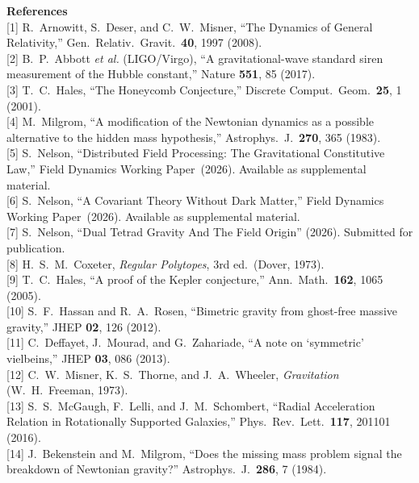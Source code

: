 \documentclass[11pt]{article}
\begin{document}
\small
\textbf{References}\\[4pt]
{[1]} R.~Arnowitt, S.~Deser, and C.~W.~Misner, ``The Dynamics of General Relativity,'' Gen.\ Relativ.\ Gravit.\ \textbf{40}, 1997 (2008).\\
{[2]} B.~P.~Abbott \textit{et al.} (LIGO/Virgo), ``A gravitational-wave standard siren measurement of the Hubble constant,'' Nature \textbf{551}, 85 (2017).\\
{[3]} T.~C.~Hales, ``The Honeycomb Conjecture,'' Discrete Comput.\ Geom.\ \textbf{25}, 1 (2001).\\
{[4]} M.~Milgrom, ``A modification of the Newtonian dynamics as a possible alternative to the hidden mass hypothesis,'' Astrophys.\ J.\ \textbf{270}, 365 (1983).\\
{[5]} S.~Nelson, ``Distributed Field Processing: The Gravitational Constitutive Law,'' Field Dynamics Working Paper~(2026).
Available as supplemental material.\\
{[6]} S.~Nelson, ``A Covariant Theory Without Dark Matter,'' Field Dynamics Working Paper~(2026).
Available as supplemental material.\\
{[7]} S.~Nelson, ``Dual Tetrad Gravity And The Field Origin'' (2026).
Submitted for publication.\\
{[8]} H.~S.~M.~Coxeter, \textit{Regular Polytopes}, 3rd ed.\ (Dover, 1973).\\
{[9]} T.~C.~Hales, ``A proof of the Kepler conjecture,'' Ann.\ Math.\ \textbf{162}, 1065 (2005).\\
{[10]} S.~F.~Hassan and R.~A.~Rosen, ``Bimetric gravity from ghost-free massive gravity,'' JHEP \textbf{02}, 126 (2012).\\
{[11]} C.~Deffayet, J.~Mourad, and G.~Zahariade, ``A note on `symmetric' vielbeins,'' JHEP \textbf{03}, 086 (2013).\\
{[12]} C.~W.~Misner, K.~S.~Thorne, and J.~A.~Wheeler, \textit{Gravitation} (W.~H.~Freeman, 1973).\\
{[13]} S.~S.~McGaugh, F.~Lelli, and J.~M.~Schombert, ``Radial Acceleration Relation in Rotationally Supported Galaxies,'' Phys.\ Rev.\ Lett.\ \textbf{117}, 201101 (2016).\\
{[14]} J.~Bekenstein and M.~Milgrom, ``Does the missing mass problem signal the breakdown of Newtonian gravity?'' Astrophys.\ J.\ \textbf{286}, 7 (1984).
\end{document}
